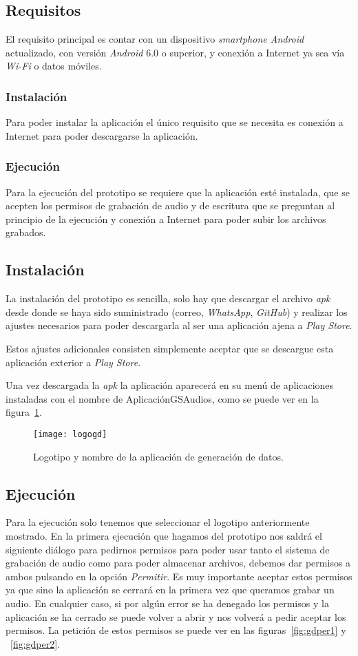 \subsection{Requisitos}
El requisito principal es contar con un dispositivo \textit{smartphone Android} actualizado, con versión \textit{Android} 6.0 o superior, y conexión a Internet ya sea vía \textit{Wi-Fi} o datos móviles.

\subsubsection{Instalación}
Para poder instalar la aplicación el único requisito que se necesita es conexión a Internet para poder descargarse la aplicación.
\subsubsection{Ejecución}
Para la ejecución del prototipo se requiere que la aplicación esté instalada, que se acepten los permisos de grabación de audio y de escritura que se preguntan al principio de la ejecución y conexión a Internet para poder subir los archivos grabados.

\subsection{Instalación}
La instalación del prototipo es sencilla, solo hay que descargar el archivo \textit{apk} desde donde se haya sido suministrado (correo, \textit{WhatsApp}, \textit{GitHub}) y realizar los ajustes necesarios para poder descargarla al ser una aplicación ajena a \textit{Play Store}.

Estos ajustes adicionales consisten simplemente aceptar que se descargue esta aplicación exterior a \textit{Play Store}.

Una vez descargada la \textit{apk} la aplicación aparecerá en su menú de aplicaciones instaladas con el nombre de AplicaciónGSAudios, como se puede ver en la figura~\ref{fig:logogd}.

\begin{figure}[htb]
	\centering
	\texttt{[image: logogd]}
	\caption{Logotipo y nombre de la aplicación de generación de datos.}
	\label{fig:logogd}
\end{figure}

\subsection{Ejecución}
Para la ejecución solo tenemos que seleccionar el logotipo anteriormente mostrado. En la primera ejecución que hagamos del prototipo nos saldrá el siguiente diálogo para pedirnos permisos para poder usar tanto el sistema de grabación de audio como para poder almacenar archivos, debemos dar permisos a ambos pulsando en la opción \textit{Permitir}. Es muy importante aceptar estos permisos ya que sino la aplicación se cerrará en la primera vez que queramos grabar un audio. En cualquier caso, si por algún error se ha denegado los permisos y la aplicación se ha cerrado se puede volver a abrir y nos volverá a pedir aceptar los permisos. La petición de estos permisos se puede ver en las figuras~\ref{fig:gdper1} y ~\ref{fig:gdper2}.

